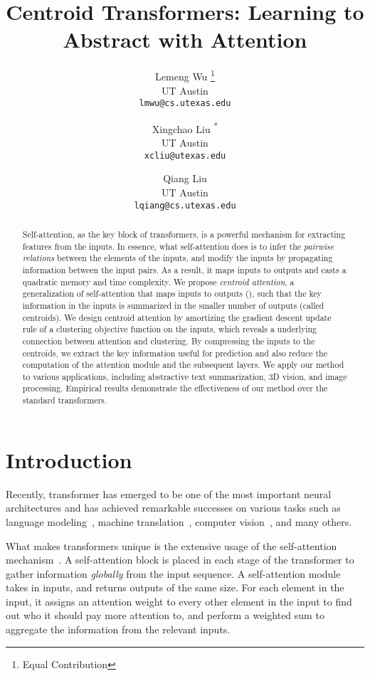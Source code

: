\documentclass[english]{article}
\title{Centroid Transformers: Learning to Abstract with Attention}
\author{Lemeng Wu \thanks{Equal Contribution} \\
  UT Austin \\
  \texttt{lmwu@cs.utexas.edu} \\
\and
   Xingchao Liu \textsuperscript{*} \\
  UT Austin\\
\texttt{xcliu@utexas.edu} \\
  \and
   Qiang Liu \\
  UT Austin \\
\texttt{lqiang@cs.utexas.edu} \\
}
\date{}
\begin{document}







\begin{abstract}
Self-attention, as the key block of transformers,
is a powerful mechanism for extracting features from the inputs.
In essence,
what self-attention does is to infer the
\emph{pairwise  relations} between  the  elements of the inputs,
and modify the inputs by propagating information between the input pairs.
As a result, it maps  inputs to  outputs
and casts a quadratic 
memory and time complexity.
We propose \emph{centroid attention},
a generalization of self-attention that maps  inputs to  outputs (),
such that the key information in the inputs is summarized in the smaller number of outputs (called centroids).
We design centroid attention by amortizing
the gradient descent update rule of a clustering objective function on the inputs, which reveals a underlying connection between attention and clustering.
By compressing the inputs to the centroids,
we extract the key information useful for prediction and also reduce the computation of the  attention module and the subsequent layers.
We apply our method to various applications, including abstractive text summarization, 3D vision, and image processing.
Empirical results demonstrate the effectiveness of our method over the standard transformers.

\end{abstract}

\section{Introduction}
Recently, transformer \citep{vaswani2017attention} has emerged to be
one of the most important neural architectures 
and has achieved remarkable successes on various tasks such as 
language modeling~\citep{irie2019language, jiao2020tinybert}, 
 machine translation~\citep{vaswani2017attention,zhang2018improving,wang2019learning},   computer vision~\citep{carion2020end, dosovitskiy2020image}, and many others. 

What makes transformers unique is the extensive usage of the self-attention mechanism~\citep{vaswani2017attention}. A self-attention block is placed in each stage of the transformer to gather information \emph{globally} from the input sequence. 
A self-attention module takes in  inputs, and returns  outputs of the same size.
For each element in the input, it assigns an attention weight to every other element in the input to find out who it should pay more attention to,  
and perform a weighted sum to aggregate the information from the relevant inputs. 
\end{document}
